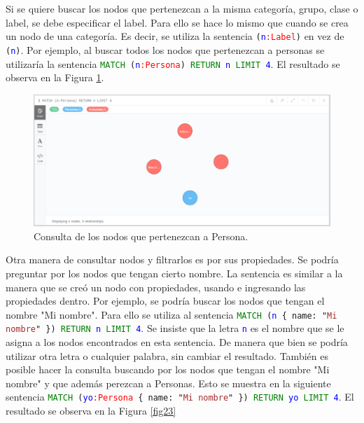 \documentclass[conference]{IEEEtran}
\begin{document}
Si se quiere buscar los nodos que pertenezcan a la misma categoría, grupo, clase o label, se debe especificar el label. Para ello se hace lo mismo que cuando se crea un nodo de una categoría. Es decir, se utiliza la sentencia \texttt{(\textcolor{blue}{n}\textcolor{red}{:Label})} en vez de \texttt{(\textcolor{blue}{n})}. Por ejemplo, al buscar todos los nodos que pertenezcan a personas se utilizaría la sentencia \texttt{\textcolor{green}{MATCH} (\textcolor{blue}{n}\textcolor{red}{:Persona}) \textcolor{green}{RETURN} \textcolor{blue}{n} \textcolor{green}{LIMIT} \textcolor{blue}{4}}. El resultado se observa en la Figura \ref{fig22}.


\begin{figure}[H]
\begin{center}
\includegraphics[width= 0.45 \textwidth]{consulta_label1.png}
\end{center}
\caption{Consulta de los nodos que pertenezcan a Persona.}
\label{fig22}
\end{figure}

Otra manera de consultar nodos y filtrarlos es por sus propiedades. Se podría preguntar por los nodos que tengan cierto nombre. La sentencia es similar a la manera que se creó un nodo con propiedades, usando { } e ingresando las propiedades dentro. Por ejemplo, se podría buscar los nodos que tengan el nombre "Mi nombre". Para ello se utiliza al sentencia \texttt{\textcolor{green}{MATCH} (\textcolor{blue}{n} \{ name: "\textcolor{brown}{Mi nombre}" \}) \textcolor{green}{RETURN} \textcolor{blue}{n} \textcolor{green}{LIMIT} \textcolor{blue}{4}}. Se insiste que la letra \texttt{\textcolor{blue}{n}} es el nombre que se le asigna a los nodos encontrados en esta sentencia. De manera que bien se podría utilizar otra letra o cualquier palabra, sin cambiar el resultado. También es posible hacer la consulta buscando por los nodos que tengan el nombre "Mi nombre" y que además perezcan a Personas. Esto se muestra en la siguiente sentencia \texttt{\textcolor{green}{MATCH} (\textcolor{blue}{yo}\textcolor{red}{:Persona} \{ name: "\textcolor{brown}{Mi nombre}" \}) \textcolor{green}{RETURN} \textcolor{blue}{yo} \textcolor{green}{LIMIT} \textcolor{blue}{4}}. El resultado se observa en la Figura \ref{fig23}
\end{document}
